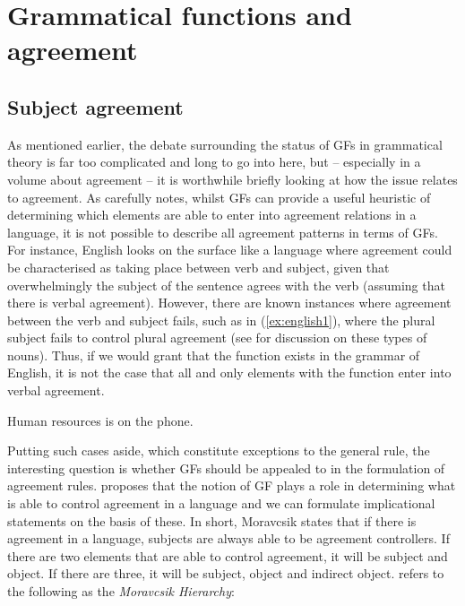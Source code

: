 \documentclass[output=paper
,modfonts
,nonflat]{langsci/langscibook}
\begin{document}
\section{Grammatical functions and agreement}\label{gfagr}
\subsection{Subject agreement}
As mentioned earlier, the debate surrounding the status of GFs in grammatical theory is far too complicated and long to go into here, but -- especially in a volume about agreement -- it is worthwhile briefly looking at how the issue relates to agreement.
As \citet{corbett2012gr} carefully notes, whilst GFs can provide a useful heuristic of determining which elements are able to enter into agreement relations in a language, it is not possible to describe all agreement patterns in terms of GFs.
For instance, English looks on the surface like a language where agreement could be characterised as taking place between verb and subject, given that overwhelmingly the subject of the sentence agrees with the verb (assuming that there is verbal agreement).
However, there are known instances where agreement between the verb and subject fails, such as in (\ref{ex:english1}), where the plural subject fails to control plural agreement (see \citealt{pollardsag1994} for discussion on these types of nouns). 
Thus, if we would grant that the \subj{} function exists in the grammar of English, it is not the case that all and only elements with the \subj{} function enter into verbal agreement.

\begin{exe}
\ex \label{ex:english1}
Human resources is on the phone.
\end{exe}

\noindent Putting such cases aside, which constitute exceptions to the general rule, the interesting question is whether GFs should be appealed to in the formulation of agreement rules. 
\citet{Moravcsik1974,moravcsik1978} proposes that the notion of GF plays a role in determining what is able to control agreement in a language and we can formulate implicational statements on the basis of these. 
In short, Moravcsik states that if there is agreement in a language, subjects are always able to be agreement controllers.
If there are two elements that are able to control agreement, it will be subject and object. 
If there are three, it will be subject, object and indirect object. 
\citet{Bobaljik2008} refers to the following as the \textit{Moravcsik Hierarchy}:
\end{document}
